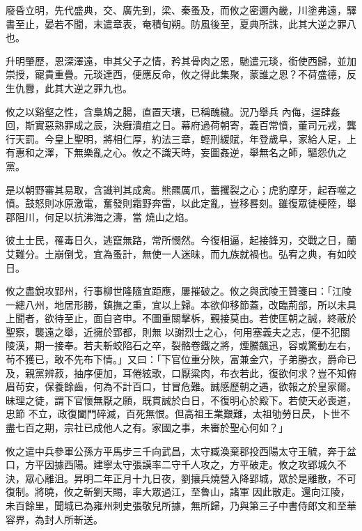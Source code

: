 \begin{pinyinscope}
 廢昏立明，先代盛典，交、廣先到，梁、秦蚤及，而攸之密邇內畿，川塗弗遠，驛書至止，晏若不聞，末遣章表，奄積旬朔。防風後至，夏典所誅，此其大逆之罪八也。



 升明肇歷，恩深澤遠，申其父子之情，矜其骨肉之恩，馳遣元琰，銜使西歸，並加崇授，寵貴重疊。元琰達西，便應反命，攸之得此集聚，蒙誰之恩？不荷盛德，反生仇釁，此其大逆之罪九也。



 攸之以谿壑之性，含梟鴆之腸，直置天壤，已稱醜穢。況乃舉兵
 內侮，逞肆姦回，斯實惡熟罪成之辰，決癰潰疽之日。幕府過荷朝寄，義百常憤，董司元戎，龔行天罰。今皇上聖明，將相仁厚，約法三章，輕刑緩賦，年登歲阜，家給人足，上有惠和之澤，下無樂亂之心。攸之不識天時，妄圖姦逆，舉無名之師，驅怨仇之黨。



 是以朝野審其易取，含識判其成禽。熊羆厲爪，蓄攫裂之心；虎豹摩牙，起吞噬之憤。鼓怒則冰原激電，奮發則霜野奔雷，以此定亂，豈移晷刻。雖復眾徒梗陸，舉郡阻川，何足以抗沸海之濤，當
 燒山之焰。



 彼土士民，罹毒日久，逃竄無路，常所憫然。今復相逼，起接鋒刃，交戰之日，蘭艾難分。土崩倒戈，宜為蚤計，無使一人迷昧，而九族就禍也。弘宥之典，有如皎日。



 攸之盡銳攻郢州，行事柳世隆隨宜距應，屢摧破之。攸之與武陵王贊箋曰：「江陵一總八州，地居形勝，鎮撫之重，宜以上歸。本欲仰移節蓋，改臨荊部，所以未具上聞者，欲待至止，面自咨申。不圖重關擊柝，覲接莫由。若使匡朝之誠，終蔽於聖察，襲遠之舉，近擁於郢都，則無
 以謝烈士之心，何用塞義夫之志，便不犯關陵漢，期一接奉。若夫斬蛟陷石之卒，裂骼卷鐵之將，煙騰飆迅，容或驚動左右，茍不獲已，敢不先布下情。」又曰：「下官位重分陜，富兼金穴，子弟勝衣，爵命已及，親黨辨菽，抽序便加，耳倦絃歌，口厭粱肉，布衣若此，復欲何求？豈不知俯眉茍安，保養餘齒，何為不計百口，甘冒危難。誠感歷朝之遇，欲報之於皇家爾。昧理之徒，謂下官懷無厭之願，既貫誠於白日，不復明心於殿下。若使天必喪道，忠節
 不立，政復闔門碎滅，百死無恨。但高祖王業艱難，太祖劬勞日昃，卜世不盡七百之期，宗社已成他人之有。家國之事，未審於聖心何如？」



 攸之遣中兵參軍公孫方平馬步三千向武昌，太守臧渙棄郡投西陽太守王毓，奔于盆口，方平因據西陽。建寧太守張謨率二守千人攻之，方平破走。攸之攻郢城久不決，眾心離沮。昇明二年正月十九日夜，劉攘兵燒營入降郢城，眾於是離散，不可復制。將曉，攸之斬劉天賜，率大眾過江，至魯山，諸軍
 因此散走。還向江陵，未百餘里，聞城已為雍州刺史張敬兒所據，無所歸，乃與第三子中書侍郎文和至華容界，為封人所斬送。




\end{pinyinscope}
